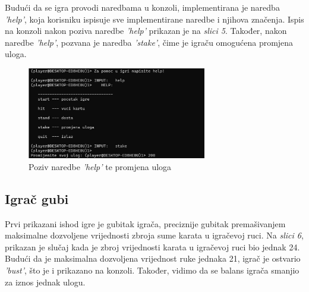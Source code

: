 \documentclass[conference]{IEEEtran}
\begin{document}
Budući da se igra provodi naredbama u konzoli, implementirana je naredba \textit{'help'}, koja korisniku ispisuje sve implementirane naredbe i njihova značenja. Ispis na konzoli nakon poziva naredbe \textit{'help'} prikazan je na \textit{slici 5}. Također, nakon naredbe \textit{'help'}, pozvana je naredba \textit{'stake'}, čime je igraču omogućena promjena uloga.

\begin{figure}[H]
\centerline{\includegraphics[width=18.5pc]{2.jpeg}}
\caption{Poziv naredbe \textit{'help'} te promjena uloga}
\vspace*{-5pt}
\end{figure}


\subsection{Igrač gubi}

Prvi prikazani ishod igre je gubitak igrača, preciznije gubitak premašivanjem maksimalne dozvoljene vrijednosti zbroja sume karata u igračevoj ruci. Na \textit{slici 6}, prikazan je slučaj kada je zbroj vrijednosti karata u igračevoj ruci bio jednak 24. Budući da je maksimalna dozvoljena vrijednost ruke jednaka 21, igrač je ostvario \textit{'bust'}, što je i prikazano na konzoli. Također, vidimo da se balans igrača smanjio za iznos jednak ulogu.
\end{document}
